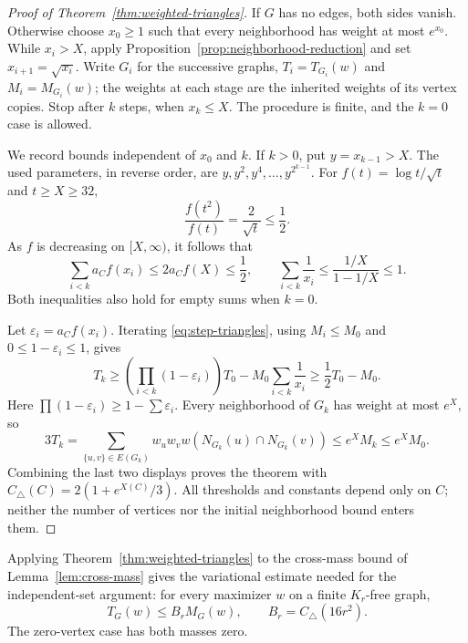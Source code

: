 \begin{proof}[Proof of Theorem~\ref{thm:weighted-triangles}]
If $G$ has no edges, both sides vanish. Otherwise choose $x_0\ge1$
such that every neighborhood has weight at most $e^{x_0}$. While
$x_i>X$, apply Proposition~\ref{prop:neighborhood-reduction} and
set $x_{i+1}=\sqrt{x_i}$. Write $G_i$ for the successive graphs,
$T_i=T_{G_i}(w)$ and $M_i=M_{G_i}(w)$; the weights at each stage
are the inherited weights of its vertex copies. Stop after $k$ steps,
when $x_k\le X$. The procedure is finite, and the $k=0$ case is
allowed.

We record bounds independent of $x_0$ and $k$. If $k>0$, put
$y=x_{k-1}>X$. The used parameters, in reverse order, are
$y,y^2,y^4,\ldots,y^{2^{k-1}}$. For
$f(t)=\log t/\sqrt t$ and $t\ge X\ge32$,
\[
 \frac{f(t^2)}{f(t)}=\frac2{\sqrt t}\le\frac12.
\]
As $f$ is decreasing on $[X,\infty)$, it follows that
\begin{equation}\label{eq:summable-losses}
 \sum_{i<k}a_Cf(x_i)\le2a_Cf(X)\le\frac12,
 \qquad
 \sum_{i<k}\frac1{x_i}\le\frac{1/X}{1-1/X}\le1.
\end{equation}
Both inequalities also hold for empty sums when $k=0$.

Let $\varepsilon_i=a_Cf(x_i)$. Iterating
\eqref{eq:step-triangles}, using $M_i\le M_0$ and
$0\le1-\varepsilon_i\le1$, gives
\[
 T_k\ge\left(\prod_{i<k}(1-\varepsilon_i)\right)T_0
          -M_0\sum_{i<k}\frac1{x_i}
 \ge\frac12T_0-M_0.
\]
Here $\prod(1-\varepsilon_i)\ge1-\sum\varepsilon_i$.
Every neighborhood of $G_k$ has weight at most $e^X$, so
\[
 3T_k
 =\sum_{\{u,v\}\in E(G_k)}w_uw_vw(N_{G_k}(u)\cap N_{G_k}(v))
 \le e^X M_k\le e^X M_0.
\]
Combining the last two displays proves the theorem with
$C_\triangle(C)=2(1+e^{X(C)}/3)$. All
thresholds and constants depend only on $C$; neither the number of
vertices nor the initial neighborhood bound enters them.
\end{proof}


Applying Theorem~\ref{thm:weighted-triangles} to the cross-mass bound
of Lemma~\ref{lem:cross-mass} gives the variational estimate needed
for the independent-set argument: for every maximizer $w$ on a finite
$K_r$-free graph,
\begin{equation}\label{eq:optimizer-triangle}
 T_G(w)\le B_r M_G(w),\qquad B_r=C_{\triangle}(16r^2).
\end{equation}
The zero-vertex case has both masses zero.
